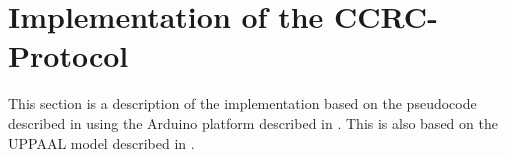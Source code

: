 \section{Implementation of the CCRC-Protocol}
This section is a description of the implementation based on the pseudocode described in  using the Arduino platform described in . 
This is also based on the UPPAAL model described in .


